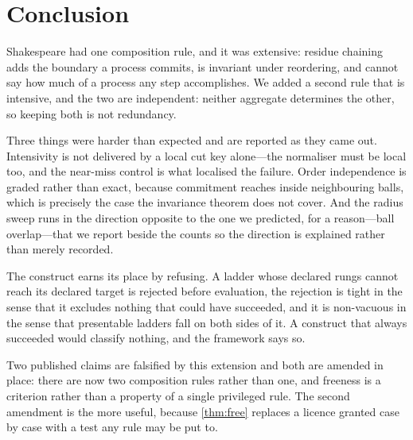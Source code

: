 \documentclass[11pt,twocolumn,a4paper]{article}
\theoremstyle{plain}
\theoremstyle{definition}
\theoremstyle{remark}
\begin{document}
\section{Conclusion}
\label{sec:conclusion}

Shakespeare had one composition rule, and it was extensive: residue chaining
adds the boundary a process commits, is invariant under reordering, and cannot
say how much of a process any step accomplishes. We added a second rule that is
intensive, and the two are independent: neither aggregate determines the other,
so keeping both is not redundancy.

Three things were harder than expected and are reported as they came out.
Intensivity is not delivered by a local cut key alone---the normaliser must be
local too, and the near-miss control is what localised the failure. Order
independence is graded rather than exact, because commitment reaches inside
neighbouring balls, which is precisely the case the invariance theorem does not
cover. And the radius sweep runs in the direction opposite to the one we
predicted, for a reason---ball overlap---that we report beside the counts so
the direction is explained rather than merely recorded.

The construct earns its place by refusing. A ladder whose declared rungs cannot
reach its declared target is rejected before evaluation, the rejection is tight
in the sense that it excludes nothing that could have succeeded, and it is
non-vacuous in the sense that presentable ladders fall on both sides of it. A
construct that always succeeded would classify nothing, and the framework says
so.

Two published claims are falsified by this extension and both are amended in
place: there are now two composition rules rather than one, and freeness is a
criterion rather than a property of a single privileged rule. The second
amendment is the more useful, because \cref{thm:free} replaces a licence
granted case by case with a test any rule may be put to.



\end{document}
